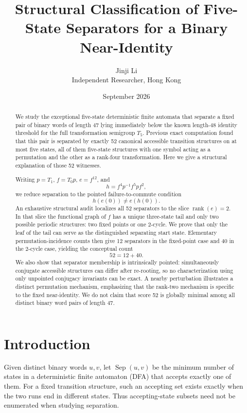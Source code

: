 \documentclass[10pt]{article}
\title{\textbf{Structural Classification of Five-State Separators for a Binary Near-Identity}}
\author{Jinji Li\\\small Independent Researcher, Hong Kong}
\date{September 2026}
\newcommand{\Sep}{\operatorname{Sep}}
\newcommand{\rank}{\operatorname{rank}}
\begin{document}
\maketitle
\vspace{-1.4em}

\begin{abstract}
We study the exceptional five-state deterministic finite automata that separate a fixed pair of binary words of length 47 lying immediately below the known length-48 identity threshold for the full transformation semigroup $T_5$. Previous exact computation found that this pair is separated by exactly 52 canonical accessible transition structures on at most five states, all of them five-state structures with one symbol acting as a permutation and the other as a rank-four transformation. Here we give a structural explanation of those 52 witnesses.

Writing $p=T_1$, $f=T_0p$, $e=f^{12}$, and
\[
h=f^4p^{-1}f^5pf^2,
\]
we reduce separation to the pointed failure-to-commute condition
\[
h(e(0))\neq e(h(0)).
\]
An exhaustive structural audit localizes all 52 separators to the slice $\rank(e)=2$. In that slice the functional graph of $f$ has a unique three-state tail and only two possible periodic structures: two fixed points or one $2$-cycle. We prove that only the leaf of the tail can serve as the distinguished separating start state. Elementary permutation-incidence counts then give 12 separators in the fixed-point case and 40 in the $2$-cycle case, yielding the conceptual count
\[
52=12+40.
\]
We also show that separator membership is intrinsically pointed: simultaneously conjugate accessible structures can differ after re-rooting, so no characterization using only unpointed conjugacy invariants can be exact. A nearby perturbation illustrates a distinct permutation mechanism, emphasizing that the rank-two mechanism is specific to the fixed near-identity. We do not claim that score 52 is globally minimal among all distinct binary word pairs of length 47.
\end{abstract}

\section{Introduction}

Given distinct binary words $u,v$, let $\Sep(u,v)$ be the minimum number of states in a deterministic finite automaton (DFA) that accepts exactly one of them. For a fixed transition structure, such an accepting set exists exactly when the two runs end in different states. Thus accepting-state subsets need not be enumerated when studying separation.
\end{document}
